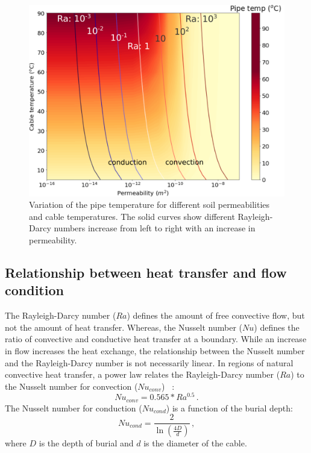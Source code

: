 \documentclass[Journal,letterpaper,InsideFigs]{ascelike-new}
\begin{document}
\begin{figure}
    \centering
    \includegraphics[width=\textwidth]{figs/conduction-convection.png}
    \caption{Variation of the pipe temperature for different soil permeabilities and cable temperatures. The solid curves show different Rayleigh-Darcy numbers increase from left to right with an increase in permeability.}
    \label{fig:ra-temp-contour}
\end{figure}

\subsection*{Relationship between heat transfer and flow condition}
The Rayleigh-Darcy number ($Ra$) defines the amount of free convective flow, but not the amount of heat transfer. Whereas, the Nusselt number ($Nu$) defines the ratio of convective and conductive heat transfer at a boundary. While an increase in flow increases the heat exchange, the relationship between the Nusselt number and the Rayleigh-Darcy number is not necessarily linear. In regions of natural convective heat transfer, a power law relates the Rayleigh-Darcy number ($Ra$) to the Nusselt number for convection ($Nu_{conv}$) ~\cite{hardee1976boundary,merkin1979free}:
\begin{equation}
Nu_{conv} = 0.565 * Ra^{0.5}\,.
\label{eq:nu-conv}
\end{equation}
The Nusselt number for conduction ($Nu_{cond}$) is a function of the burial depth:
\begin{equation}
    Nu_{cond} = \frac{2}{\ln \left(\frac{4 D}{d}\right)}\,,
    \label{eq:nu-cond}
\end{equation}
where $D$ is the depth of burial and $d$ is the diameter of the cable. 
\end{document}
